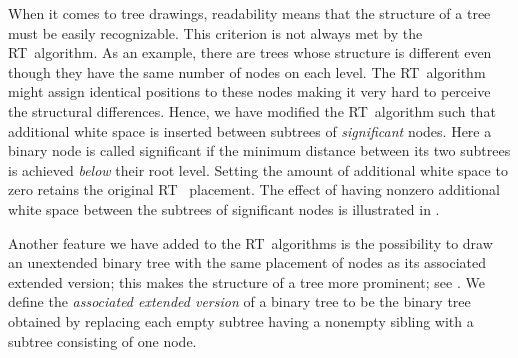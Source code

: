 When it comes to tree drawings, readability means that the structure of
a tree must be easily recognizable. This criterion is not always met
by the RT~algorithm. As an example, there are trees whose structure is 
different even though they have the same number
of nodes on each level. The RT~algorithm might assign identical positions to
these nodes making it very hard to perceive the structural differences.
Hence, we have modified the RT~algorithm such that additional white space
is inserted between subtrees of
\emph{significant} nodes. Here a binary node
is called significant if the minimum distance
between its two subtrees is achieved \emph{below} their root level.
Setting the amount of additional white space to zero retains the original RT~%
placement. The effect of having nonzero additional white space between
the subtrees of significant
nodes is illustrated in .

Another feature we have added to the RT~algorithms is the possibility to draw
an unextended binary tree with the same placement of nodes as its
associated extended version;
this makes the structure of a tree more prominent; see .
We define the \emph{associated extended version}
of a binary tree to be the binary tree obtained by replacing each empty subtree
having a nonempty sibling with a subtree consisting of one node. 



